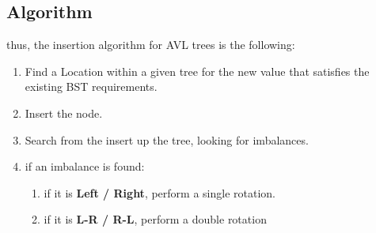 \documentclass[12pt]{book}
\begin{document}
{\subsection*{Algorithm}
thus, the insertion algorithm for AVL trees is the following:
\begin{enumerate}
        \item Find a Location within a given tree for the new value that satisfies the existing BST requirements.
        \item Insert the node.
        \item Search from the insert up the tree, looking for imbalances.
        \item if an imbalance is found:
        \begin{enumerate}
                \item if it is \textbf{Left / Right}, perform a single rotation.
                \item if it is \textbf{L-R / R-L}, perform a double rotation
        \end{enumerate}
\end{enumerate}
 }
\end{document}

